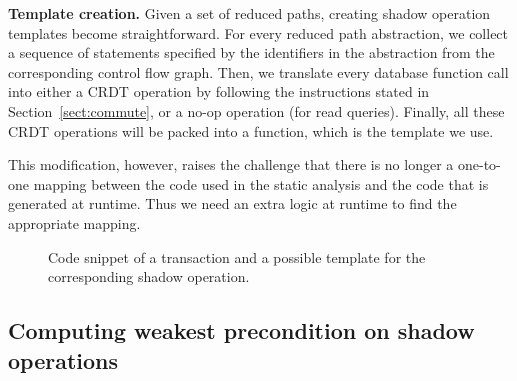 {\bf Template creation.}
Given a set of reduced paths, creating shadow operation templates become
straightforward. For every reduced path abstraction, we collect a sequence of
statements specified by the identifiers in the abstraction from the corresponding control flow graph.
Then, we translate every database function call into either a CRDT operation by following
the instructions stated in Section~\ref{sect:commute}, or a no-op operation (for read queries). 
Finally, all these CRDT operations will be packed into a function, which
is the template we use.

This modification, however, raises the challenge that there is no
longer a one-to-one mapping between the code used in the static analysis
and the code that is generated at runtime. Thus we need an extra logic
at runtime to find the appropriate mapping.
\fi



\begin{figure*}[!ht]
\begin{minipage}[b]{.48\textwidth}
\begin{subfigure}[Original code]{
\label{fig:codeOriginal}
}
\end{subfigure}
\end{minipage}
\begin{minipage}[b]{.48\textwidth}
\begin{subfigure}[Possible corresponding shadow template]{
\label{fig:codeShadow}
}
\end{subfigure}
\end{minipage}
\caption{Code snippet of a transaction and a possible template for the corresponding shadow operation.}
\label{fig:codeDoBuy}
\end{figure*}

\subsection{Computing weakest precondition on shadow operations}


